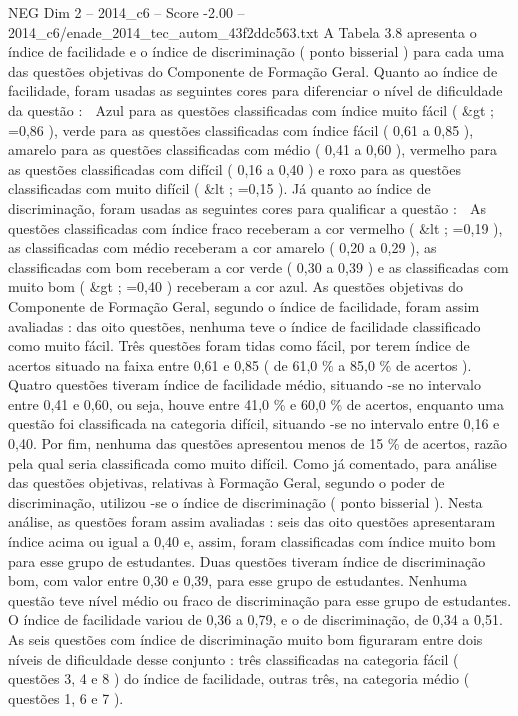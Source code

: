 \begin{textsample}{NEG Dim 2 – 2014\_c6 – Score -2.00 – 2014\_c6/enade\_2014\_tec\_autom\_43f2ddc563.txt}
A Tabela 3.8 apresenta o índice de facilidade e o índice de discriminação ( ponto bisserial ) para cada uma das questões objetivas do Componente de Formação Geral.
Quanto ao índice de facilidade, foram usadas as seguintes cores para diferenciar o nível de dificuldade da questão :  Azul para as questões classificadas com índice muito fácil ( \&gt ; =0,86 ), verde para as questões classificadas com índice fácil ( 0,61 a 0,85 ), amarelo para as questões classificadas com médio ( 0,41 a 0,60 ), vermelho para as questões classificadas com difícil ( 0,16 a 0,40 ) e roxo para as questões classificadas com muito difícil ( \&lt ; =0,15 ).
Já quanto ao índice de discriminação, foram usadas as seguintes cores para qualificar a questão :  As questões classificadas com índice fraco receberam a cor vermelho ( \&lt ; =0,19 ), as classificadas com médio receberam a cor amarelo ( 0,20 a 0,29 ), as classificadas com bom receberam a cor verde ( 0,30 a 0,39 ) e as classificadas com muito bom ( \&gt ; =0,40 ) receberam a cor azul.
As questões objetivas do Componente de Formação Geral, segundo o índice de facilidade, foram assim avaliadas : das oito questões, nenhuma teve o índice de facilidade classificado como muito fácil.
Três questões foram tidas como fácil, por terem índice de acertos situado na faixa entre 0,61 e 0,85 ( de 61,0 \% a 85,0 \% de acertos ).
Quatro questões tiveram índice de facilidade médio, situando -se no intervalo entre 0,41 e 0,60, ou seja, houve entre 41,0 \% e 60,0 \% de acertos, enquanto uma questão foi classificada na categoria difícil, situando -se no intervalo entre 0,16 e 0,40.
Por fim, nenhuma das questões apresentou menos de 15 \% de acertos, razão pela qual seria classificada como muito difícil.
Como já comentado, para análise das questões objetivas, relativas à Formação Geral, segundo o poder de discriminação, utilizou -se o índice de discriminação ( ponto bisserial ).
Nesta análise, as questões foram assim avaliadas : seis das oito questões apresentaram índice acima ou igual a 0,40 e, assim, foram classificadas com índice muito bom para esse grupo de estudantes.
Duas questões tiveram índice de discriminação bom, com valor entre 0,30 e 0,39, para esse grupo de estudantes.
Nenhuma questão teve nível médio ou fraco de discriminação para esse grupo de estudantes.
O índice de facilidade variou de 0,36 a 0,79, e o de discriminação, de 0,34 a 0,51.
As seis questões com índice de discriminação muito bom figuraram entre dois níveis de dificuldade desse conjunto : três classificadas na categoria fácil ( questões 3, 4 e 8 ) do índice de facilidade, outras três, na categoria médio ( questões 1, 6 e 7 ).

\end{textsample}

